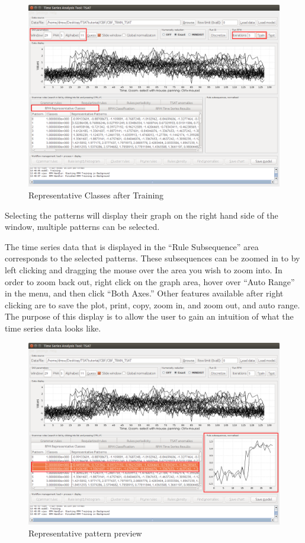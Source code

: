 \documentclass[titlepage, letterpaper, 12pt]{article}
\begin{document}
\begin{figure}[H]
	\includegraphics[width=\textwidth]{TSAT-training-step-5}
	\caption{Representative Classes after Training}
	\label{fig:TSAT-training-step-5}
\end{figure}

\newpage
Selecting the patterns will display their graph on the right hand side of the window, multiple patterns can be selected.

The time series data that is displayed in the ``Rule Subsequence'' area corresponds to the selected patterns.  These subsequences can be zoomed in to by left clicking and dragging the mouse over the area you wish to zoom into.  In order to zoom back out, right click on the graph area, hover over ``Auto Range'' in the menu, and then click ``Both Axes.''  Other features available after right clicking are to save the plot, print, copy, zoom in, and zoom out, and auto range.  The purpose of this display is to allow the user to gain an intuition of what the time series data looks like.

\begin{figure}[H]
	\includegraphics[width=\textwidth]{TSAT-training-step-6}
	\caption{Representative pattern preview}
	\label{fig:TSAT-training-step-6}
\end{figure}
\end{document}
